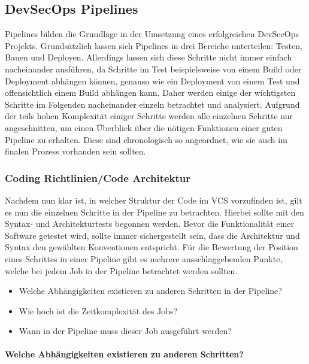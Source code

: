 \subsection{DevSecOps Pipelines}

Pipelines bilden die Grundlage in der Umsetzung eines erfolgreichen DevSecOps Projekts.
Grundsätzlich lassen sich Pipelines in drei Bereiche unterteilen: Testen, Bauen und Deployen.
Allerdings lassen sich diese Schritte nicht immer einfach nacheinander ausführen, da Schritte im Test beispielsweise von einem Build oder Deployment abhängen können, genauso wie ein Deployment von einem Test und offensichtlich einem Build abhängen kann.
Daher werden einige der wichtigsten Schritte im Folgenden nacheinander einzeln betrachtet und analysiert.
Aufgrund der teils hohen Komplexität einiger Schritte werden alle einzelnen Schritte nur angeschnitten, um einen Überblick über die nötigen Funktionen einer guten Pipeline zu erhalten.
Diese sind chronologisch so angeordnet, wie sie auch im finalen Prozess vorhanden sein sollten.

\subsubsection{Coding Richtlinien/Code Architektur}\label{subsubsec:codingguidelines/codearchitecture}

Nachdem nun klar ist, in welcher Struktur der Code im VCS vorzufinden ist, gilt es nun die einzelnen Schritte in der Pipeline zu betrachten.
Hierbei sollte mit den Syntax- und Architekturtests begonnen werden.
Bevor die Funktionalität einer Software getestet wird, sollte immer sichergestellt sein, dass die Architektur und Syntax den gewählten Konventionen entspricht.
Für die Bewertung der Position eines Schrittes in einer Pipeline gibt es mehrere ausschlaggebenden Punkte, welche bei jedem Job in der Pipeline betrachtet werden sollten.
\begin{itemize}
    \item Welche Abhängigkeiten existieren zu anderen Schritten in der Pipeline?
    \item Wie hoch ist die Zeitkomplexität des Jobs?
    \item Wann in der Pipeline muss dieser Job ausgeführt werden?
\end{itemize}

\paragraph{Welche Abhängigkeiten existieren zu anderen Schritten?}

